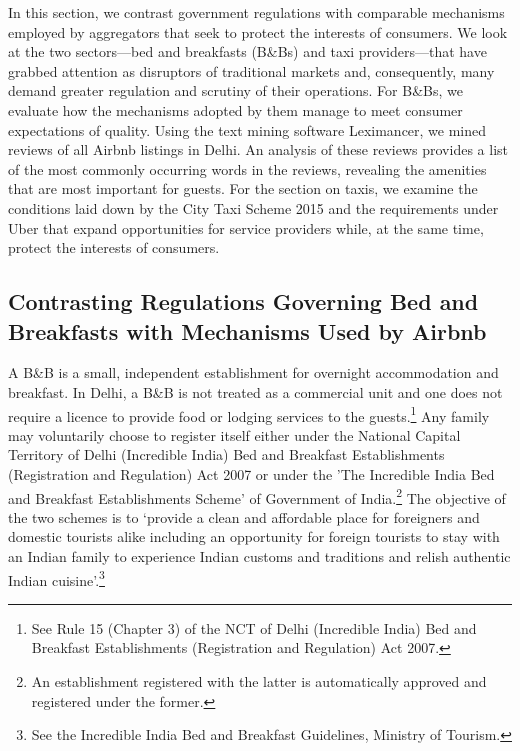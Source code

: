 \documentclass[a4paper, 12pt]{article}
\begin{document}
In this section, we contrast government regulations with comparable mechanisms employed by aggregators that seek to protect the interests of consumers. We look at the two sectors—bed and breakfasts (B\&Bs) and taxi providers—that have grabbed attention as disruptors of traditional markets and, consequently, many demand greater regulation and scrutiny of their operations. For B\&Bs, we evaluate how the mechanisms adopted by them manage to meet consumer expectations of quality. Using the text mining software Leximancer, we mined reviews of all Airbnb listings in Delhi. An analysis of these reviews provides a list of the most commonly occurring words in the reviews, revealing the amenities that are most important for guests. For the section on taxis, we examine the conditions laid down by the City Taxi Scheme 2015 and the requirements under Uber that expand opportunities for service providers while, at the same time, protect the interests of consumers.           
                    
           
                    \subsection{Contrasting Regulations Governing Bed and Breakfasts with Mechanisms Used by Airbnb}

A B\&B is a small, independent establishment for overnight accommodation and breakfast. In Delhi, a B\&B is not treated as a commercial unit and one does not require a licence to provide food or lodging services to the guests.\footnote{See Rule 15 (Chapter 3) of  the NCT of Delhi (Incredible India) Bed and Breakfast Establishments (Registration and Regulation) Act 2007.} Any family may voluntarily choose to register itself either under the National Capital Territory of Delhi (Incredible India) Bed and Breakfast Establishments (Registration and Regulation) Act 2007 or under the 'The Incredible India Bed and Breakfast Establishments Scheme’ of Government of India.\footnote{An establishment registered with the latter is automatically approved and registered under the former.}  The objective of the two schemes is to ‘provide a clean and affordable place for foreigners and domestic tourists alike including an opportunity for foreign tourists to stay with an Indian family to experience Indian customs and traditions and relish authentic Indian cuisine’.\footnote{See the Incredible India Bed and Breakfast Guidelines, Ministry of Tourism.}  \\
                    
\end{document}
